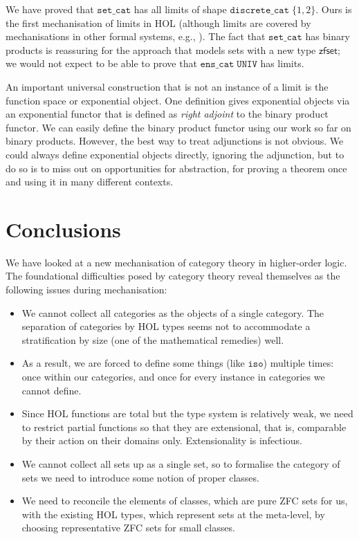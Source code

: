 \documentclass[twoside,titlepage,11pt]{article}
\begin{document}
We have proved that $\mathtt{set\_cat}$ has all limits of shape $\mathtt{discrete\_cat}\;\{1,2\}$.
Ours is the first mechanisation of limits in HOL (although limits are covered by mechanisations in other formal systems, e.g., \cite{DBLP:conf/birthday/HuetS00,Simpson04}).
The fact that $\mathtt{set\_cat}$ has binary products is reassuring for the approach that models sets with a new type $\mathsf{zfset}$; we would not expect to be able to prove that $\mathtt{ens\_cat}\;\mathtt{UNIV}$ has limits.

An important universal construction that is not an instance of a limit is the function space or exponential object.
One definition gives exponential objects via an exponential functor that is defined as \emph{right adjoint} to the binary product functor.
We can easily define the binary product functor using our work so far on binary products.
However, the best way to treat adjunctions is not obvious.
We could always define exponential objects directly, ignoring the adjunction, but to do so is to miss out on opportunities for abstraction, for proving a theorem once and using it in many different contexts.
\section{Conclusions}%
We have looked at a new mechanisation of category theory in higher-order logic.
The foundational difficulties posed by category theory reveal themselves as the following issues during mechanisation:
\begin{itemize}
\item We cannot collect all categories as the objects of a single category.
The separation of categories by HOL types seems not to accommodate a stratification by size (one of the mathematical remedies) well.
\item
As a result, we are forced to define some things (like $\mathtt{iso}$) multiple times: once within our categories, and once for every instance in categories we cannot define.
\item
Since HOL functions are total but the type system is relatively weak, we need to restrict partial functions so that they are extensional, that is, comparable by their action on their domains only.
Extensionality is infectious.
\item
We cannot collect all sets up as a single set, so to formalise the category of sets we need to introduce some notion of proper classes.
\item
We need to reconcile the elements of classes, which are pure ZFC sets for us, with the existing HOL types, which represent sets at the meta-level, by choosing representative ZFC sets for small classes.
\end{itemize}
\end{document}
